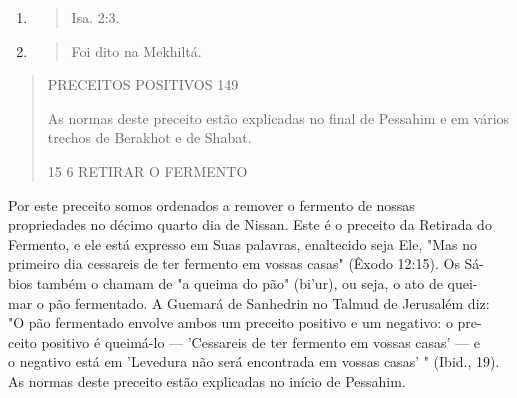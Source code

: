 \begin{enumerate}
\def\labelenumi{\arabic{enumi}.}
\setcounter{enumi}{180}
\item
  \begin{quote}
  Isa. 2:3.
  \end{quote}
\item
  \begin{quote}
  Foi dito na Mekhiltá.
  \end{quote}
\end{enumerate}

\begin{quote}
PRECEITOS POSITIVOS 149

As normas deste preceito estão explicadas no final de Pessahim e em
vários trechos de Berakhot e de Shabat.

15 6 RETIRAR O FERMENTO
\end{quote}

Por este preceito somos ordenados a remover o fermento de nossas\\
propriedades no décimo quarto dia de Nissan. Este é o preceito da
Retirada do\\
Fermento, e ele está expresso em Suas palavras, enaltecido seja Ele,
"Mas no\\
primeiro dia cessareis de ter fermento em vossas casas" (Êxodo 12:15).
Os Sá-\\
bios também o chamam de "a queima do pão" (bi'ur), ou seja, o ato de
quei-\\
mar o pão fermentado. A Guemará de Sanhedrin no Talmud de Jerusalém
diz:\\
"O pão fermentado envolve ambos um preceito positivo e um negativo: o
pre-\\
ceito positivo é queimá-lo --- 'Cessareis de ter fermento em vossas
casas' --- e\\
o negativo está em 'Levedura não será encontrada em vossas casas' "
(Ibid., 19).\\
As normas deste preceito estão explicadas no início de Pessahim.

